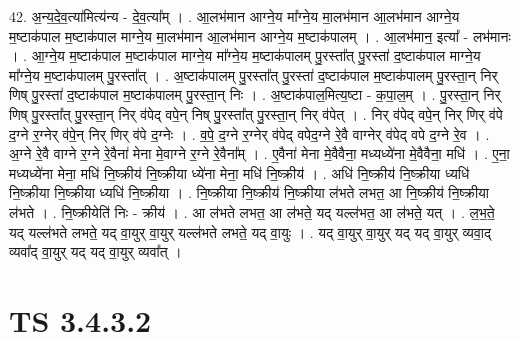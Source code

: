 \documentclass[17pt]{extarticle}
\begin{document}
42. अ॒न्य॒दे॒व॒त्या॑मित्य॑न्य - दे॒व॒त्या᳚म् । . आ॒लभ॑मान आग्ने॒य मा᳚ग्ने॒य मा॒लभ॑मान आ॒लभ॑मान आग्ने॒य म॒ष्टाक॑पाल म॒ष्टाक॑पाल माग्ने॒य मा॒लभ॑मान आ॒लभ॑मान आग्ने॒य म॒ष्टाक॑पालम् । . आ॒लभ॑मान॒ इत्या᳚ - लभ॑मानः । . आ॒ग्ने॒य म॒ष्टाक॑पाल म॒ष्टाक॑पाल माग्ने॒य मा᳚ग्ने॒य म॒ष्टाक॑पालम् पु॒रस्ता᳚त् पु॒रस्ता॑ द॒ष्टाक॑पाल माग्ने॒य मा᳚ग्ने॒य म॒ष्टाक॑पालम् पु॒रस्ता᳚त् । . अ॒ष्टाक॑पालम् पु॒रस्ता᳚त् पु॒रस्ता॑ द॒ष्टाक॑पाल म॒ष्टाक॑पालम् पु॒रस्ता॒न् निर् णिष् पु॒रस्ता॑ द॒ष्टाक॑पाल म॒ष्टाक॑पालम् पु॒रस्ता॒न् निः । . अ॒ष्टाक॑पाल॒मित्य॒ष्टा - क॒पा॒ल॒म् । . पु॒रस्ता॒न् निर् णिष् पु॒रस्ता᳚त् पु॒रस्ता॒न् निर् व॑पेद् वपे॒न् निष् पु॒रस्ता᳚त् पु॒रस्ता॒न् निर् व॑पेत् । . निर् व॑पेद् वपे॒न् निर् णिर् व॑पे द॒ग्ने र॒ग्नेर् व॑पे॒न् निर् णिर् व॑पे द॒ग्नेः । . व॒पे॒ द॒ग्ने र॒ग्नेर् व॑पेद् वपेद॒ग्ने रे॒वै वाग्नेर् व॑पेद् वपे द॒ग्ने रे॒व । . अ॒ग्ने रे॒वै वाग्ने र॒ग्ने रे॒वैना॑ मेना मे॒वाग्ने र॒ग्ने रे॒वैना᳚म् । . ए॒वैना॑ मेना मे॒वैवैना॒ मध्यध्ये॑ना मे॒वैवैना॒ मधि॑ । . ए॒ना॒ मध्यध्ये॑ना मेना॒ मधि॑ नि॒ष्क्रीय॑ नि॒ष्क्रीया ध्ये॑ना मेना॒ मधि॑ नि॒ष्क्रीय॑ । . अधि॑ नि॒ष्क्रीय॑ नि॒ष्क्रीया ध्यधि॑ नि॒ष्क्रीया नि॒ष्क्रीया ध्यधि॑ नि॒ष्क्रीया । . नि॒ष्क्रीया नि॒ष्क्रीय॑ नि॒ष्क्रीया ल॑भते लभत॒ आ नि॒ष्क्रीय॑ नि॒ष्क्रीया ल॑भते । . नि॒ष्क्रीयेति॑ निः - क्रीय॑ । . आ ल॑भते लभत॒ आ ल॑भते॒ यद् यल्ल॑भत॒ आ ल॑भते॒ यत् । . ल॒भ॒ते॒ यद् यल्ल॑भते लभते॒ यद् वा॒युर् वा॒युर् यल्ल॑भते लभते॒ यद् वा॒युः । . यद् वा॒युर् वा॒युर् यद् यद् वा॒युर् व्यवा॒द् व्यवा᳚द् वा॒युर् यद् यद् वा॒युर् व्यवा᳚त् । \newline
\pagebreak
{}

\section{ TS 3.4.3.2 }
\end{document}
